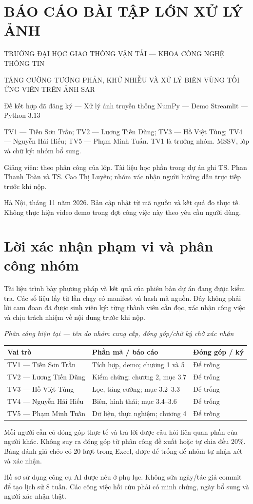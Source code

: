 \documentclass[13pt,a4paper]{extreport}
\begin{document}
\clearpage
\section*{BÁO CÁO BÀI TẬP LỚN XỬ LÝ ẢNH}
TRƯỜNG ĐẠI HỌC GIAO THÔNG VẬN TẢI — KHOA CÔNG NGHỆ THÔNG TIN
\par
TĂNG CƯỜNG TƯƠNG PHẢN, KHỬ NHIỄU VÀ XỬ LÝ BIÊN VÙNG TỐI ỨNG VIÊN TRÊN ẢNH SAR
\par
Đề kết hợp đã đăng ký — Xử lý ảnh truyền thống NumPy — Demo Streamlit — Python 3.13
\par
TV1 — Tiến Sơn Trần; TV2 — Lương Tiến Dũng; TV3 — Hồ Việt Tùng; TV4 — Nguyễn Hải Hiếu; TV5 — Phạm Minh Tuấn. TV1 là trưởng nhóm. MSSV, lớp và chữ ký: nhóm bổ sung.
\par
Giảng viên: theo phân công của lớp. Tài liệu học phần trong dự án ghi TS. Phan Thanh Toàn và TS. Cao Thị Luyên; nhóm xác nhận người hướng dẫn trực tiếp trước khi nộp.
\par
Hà Nội, tháng 11 năm 2026. Bản cập nhật từ mã nguồn và kết quả đo thực tế. Không thực hiện video demo trong đợt công việc này theo yêu cầu người dùng.
\par
\clearpage
\section*{Lời xác nhận phạm vi và phân công nhóm}
Tài liệu trình bày phương pháp và kết quả của phiên bản dự án đang được kiểm tra. Các số liệu lấy từ lần chạy có manifest và hash mã nguồn. Đây không phải lời cam đoan đã được sinh viên ký: từng thành viên cần đọc, xác nhận công việc và chịu trách nhiệm về nội dung trước khi nộp.
\par
\noindent\textit{Phân công hiện tại — tên do nhóm cung cấp, đóng góp/chữ ký chờ xác nhận}
\begin{longtable}{p{4.87cm}|p{4.87cm}|p{4.87cm}}
Vai trò & Phần mã / báo cáo & Đóng góp / ký\\\hline
TV1 — Tiến Sơn Trần & Tích hợp, demo; chương 1 và 5 & Để trống\\\hline
TV2 — Lương Tiến Dũng & Kiểm chứng; chương 2, mục 3.7 & Để trống\\\hline
TV3 — Hồ Việt Tùng & Lọc, tăng cường; mục 3.2–3.3 & Để trống\\\hline
TV4 — Nguyễn Hải Hiếu & Biên, hình thái; mục 3.4–3.6 & Để trống\\\hline
TV5 — Phạm Minh Tuấn & Dữ liệu, thực nghiệm; chương 4 & Để trống\\\hline
\end{longtable}
Mỗi người cần có đóng góp thực tế và trả lời được câu hỏi liên quan phần của người khác. Không suy ra đóng góp từ phân công đề xuất hoặc tự chia đều 20\%. Bảng đánh giá chéo có 20 lượt trong Excel, được để trống để nhóm tự nhận xét và xác nhận.
\par
Hồ sơ sử dụng công cụ AI được nêu ở phụ lục. Không sửa ngày/tác giả commit để tạo lịch sử 8 tuần. Các công việc hồi cứu phải có minh chứng, ngày bổ sung và người xác nhận thật.
\par
\clearpage
\end{document}
